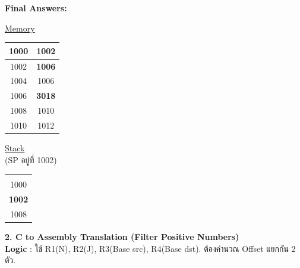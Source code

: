 \documentclass[a4paper,12pt]{article}
\begin{document}
\textbf{Final Answers:}
\begin{center}
    \begin{minipage}[t]{0.3\textwidth}
        \centering
        \underline{Memory} \\
        \begin{tabular}{|c|c|}
            \hline
            1000 & 1002 \\ \hline
            1002 & \textbf{1006} \\ \hline
            1004 & 1006 \\ \hline
            1006 & \textbf{3018} \\ \hline
            1008 & 1010 \\ \hline
            1010 & 1012 \\ \hline
        \end{tabular}
    \end{minipage}
    \hspace{1cm}
    \begin{minipage}[t]{0.3\textwidth}
        \centering
        \underline{Stack} \\
        (SP อยู่ที่ 1002) \\
        \begin{tabular}{|c|}
            \hline
             \\ \hline
             \\ \hline
            1000 \\ \hline
            \textbf{1002} \\ \hline
            1008 \\ \hline
        \end{tabular}
    \end{minipage}
\end{center}

\vspace{0.5cm}
\textbf{2. C to Assembly Translation (Filter Positive Numbers)}
\\ \textbf{Logic }: ใช้ R1(N), R2(J), R3(Base src), R4(Base dst). ต้องคำนวณ Offset แยกกัน 2 ตัว.
\end{document}
